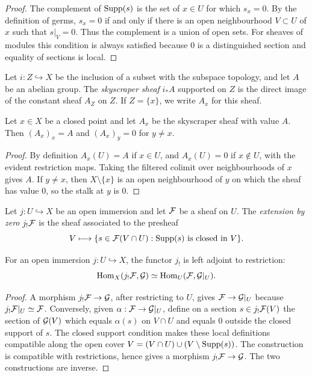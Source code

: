 \begin{proof}
The complement of \(\operatorname{Supp}(s)\) is the set of \(x\in U\) for which \(s_x=0\).
By the definition of germs, \(s_x=0\) if and only if there is an open
neighbourhood \(V\subset U\) of \(x\) such that \(s|_V=0\).  Thus the complement
is a union of open sets.  For sheaves of modules this condition is always
satisfied because \(0\) is a distinguished section and equality of sections is
local.
\end{proof}

\begin{definition}
Let \(i:Z\hookrightarrow X\) be the inclusion of a subset with the subspace
topology, and let \(A\) be an abelian group.  The \emph{skyscraper sheaf}
\(i_*A\) supported on \(Z\) is the direct image of the constant sheaf \(A_Z\) on
\(Z\).  If \(Z=\{x\}\), we write \(A_x\) for this sheaf.
\end{definition}

\begin{proposition}
Let \(x\in X\) be a closed point and let \(A_x\) be the skyscraper sheaf with
value \(A\).  Then \((A_x)_x=A\) and \((A_x)_y=0\) for \(y\ne x\).
\end{proposition}

\begin{proof}
By definition \(A_x(U)=A\) if \(x\in U\), and \(A_x(U)=0\) if \(x\notin U\),
with the evident restriction maps.  Taking the filtered colimit over
neighbourhoods of \(x\) gives \(A\).  If \(y\ne x\), then \(X\setminus\{x\}\)
is an open neighbourhood of \(y\) on which the sheaf has value \(0\), so the
stalk at \(y\) is \(0\).
\end{proof}

\begin{definition}
Let \(j:U\hookrightarrow X\) be an open immersion and let \(\mathcal{F}\) be a sheaf on
\(U\).  The \emph{extension by zero} \(j_!\mathcal{F}\) is the sheaf associated to the
presheaf
\[
    V\longmapsto
    \{s\in \mathcal{F}(V\cap U):\operatorname{Supp}(s)\text{ is closed in }V\}.
\]
\end{definition}

\begin{proposition}
For an open immersion \(j:U\hookrightarrow X\), the functor \(j_!\) is left
adjoint to restriction:
\[
    \operatorname{Hom}_X(j_!\mathcal{F},\mathcal{G})\simeq \operatorname{Hom}_U(\mathcal{F},\mathcal{G}|_U).
\]
\end{proposition}

\begin{proof}
A morphism \(j_!\mathcal{F}\to\mathcal{G}\), after restricting to \(U\), gives
\(\mathcal{F}\to\mathcal{G}|_U\) because \(j_!\mathcal{F}|_U\simeq\mathcal{F}\).  Conversely, given
\(\alpha:\mathcal{F}\to\mathcal{G}|_U\), define on a section \(s\in j_!\mathcal{F}(V)\) the section of
\(\mathcal{G}(V)\) which equals \(\alpha(s)\) on \(V\cap U\) and equals \(0\) outside
the closed support of \(s\).  The closed support condition makes these local
definitions compatible along the open cover \(V=(V\cap U)\cup(V\setminus
\operatorname{Supp}(s))\).  The construction is compatible with restrictions, hence gives a
morphism \(j_!\mathcal{F}\to\mathcal{G}\).  The two constructions are inverse.
\end{proof}

